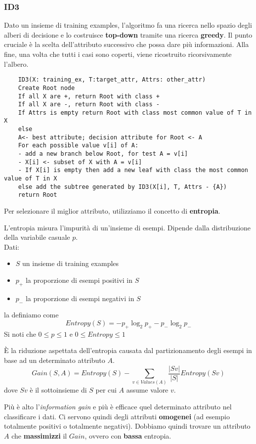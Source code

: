 \subsubsection{ID3}
Dato un insieme di training examples, l'algoritmo fa una ricerca nello spazio degli alberi di decisione e lo costruisce \textbf{top-down} tramite una ricerca \textbf{greedy}. Il punto cruciale è la scelta dell'attributo successivo che possa dare più informazioni. Alla fine, una volta che tutti i casi sono coperti, viene ricostruito ricorsivamente l'albero.
\begin{lstlisting}
	ID3(X: training_ex, T:target_attr, Attrs: other_attr)
	Create Root node
	If all X are +, return Root with class +
	If all X are -, return Root with class -
	If Attrs is empty return Root with class most common value of T in X
	else
	A<- best attribute; decision attribute for Root <- A
	For each possible value v[i] of A:
	- add a new branch below Root, for test A = v[i]
	- X[i] <- subset of X with A = v[i]
	- If X[i] is empty then add a new leaf with class the most common value of T in X
	else add the subtree generated by ID3(X[i], T, Attrs - {A})
	return Root
\end{lstlisting}
Per selezionare il miglior attributo, utilizziamo il concetto di \textbf{entropia}.
\begin{definition}[Entropia]
	L'entropia misura l'impurità di un'insieme di esempi. Dipende dalla distribuzione della variabile casuale $p$.\\
	Dati:
	\begin{itemize}
		\item $S$ un insieme di training examples
		\item $p_+$ la proporzione di esempi positivi in $S$
		\item $p_-$ la proporzione di esempi negativi in $S$
	\end{itemize}
	la definiamo come
	\begin{equation}
		Entropy(S)=-p_+\log_2p_+ - p_-\log_2p_-
	\end{equation}
	Si noti che $0 \leq p \leq 1$ e $0 \leq Entropy \leq 1$
\end{definition}

\begin{definition}
	È la riduzione aspettata dell'entropia causata dal partizionamento degli esempi in base ad un determinato attributo $A$.
	\begin{equation}
		Gain(S,A) = Entropy(S) - \sum_{v \in Values(A)} \frac{\lvert S v \rvert}{\lvert S \rvert} Entropy(Sv)
	\end{equation}
	dove $Sv$ è il sottoinsieme di $S$ per cui $A$ assume valore $v$.
\end{definition}
Più è alto l'\textit{information gain} e più è efficace quel determinato attributo nel classificare i dati. Ci servono quindi degli attributi \textbf{omogenei} (ad esempio totalmente positivi o totalmente negativi). Dobbiamo quindi trovare un attributo $A$ che \textbf{massimizzi} il $Gain$, ovvero con \textbf{bassa} entropia.

